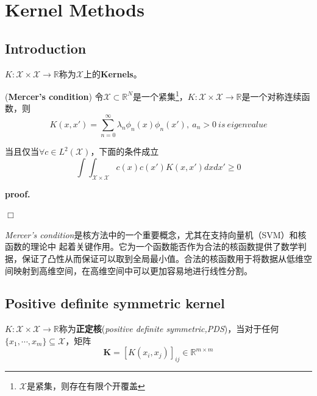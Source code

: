 \chapter{Kernel Methods}

\section{Introduction}

$K:\mathcal{X}\times \mathcal{X}\rightarrow \mathbb{R}$称为$\mathcal{X}$上的\textbf{Kernels}。

\begin{mdframed}
    \begin{theorem}
        (\textbf{Mercer's condition})\hspace{0.4em} 令$\mathcal{X}\subset \mathbb{R}^N$是一个紧集\footnote{$\mathcal{X}$是紧集，则存在有限个开覆盖}，$K:\mathcal{X}\times \mathcal{X}\rightarrow \mathbb{R}$是一个对称连续函数，则
        \begin{equation}
            K(x,x')=\sum_{n=0}^{\infty} \lambda_n\phi_n(x)\phi_n(x'),\ a_n>0 \ is \ eigenvalue
        \end{equation}

        当且仅当$\forall c\in L^2(\mathcal{X})$，下面的条件成立
        \begin{equation}
            \int\int_{\mathcal{X}\times\mathcal{X}}c(x)c(x')K(x,x')dxdx'\geqslant 0
        \end{equation}
    \end{theorem}
\end{mdframed}

\textbf{proof.}\hspace{0.5em} 

$\Box$

\textsl{Mercer’s condition}是核方法中的一个重要概念，尤其在支持向量机（SVM）和核函数的理论中
起着关键作用。它为一个函数能否作为合法的核函数提供了数学判据，保证了凸性从而保证可以取到全局最小值。合法的核函数用于将数据从低维空间映射到高维空间，在高维空间中可以更加容易地进行线性分割。

\section{Positive definite symmetric kernel}

$K:\mathcal{X}\times \mathcal{X}\rightarrow \mathbb{R}$称为\textbf{正定核}(\textsl{positive definite symmetric,PDS})，当对于任何$\{x_1,\cdots,x_m\}\subseteq \mathcal{X}$，矩阵
\begin{equation}
    \mathbf{K}=\left[ K(x_i,x_j) \right]_{ij}\in \mathbb{R}^{m\times m}
\end{equation}

